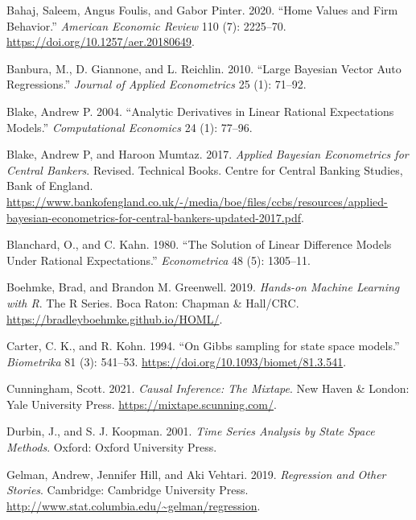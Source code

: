 \documentclass[
  letterpaper,
]{book}
\newlength{\cslhangindent}
\newlength{\cslentryspacingunit} %
\newenvironment{CSLReferences}[2] %
 {%
  \setlength{\parindent}{0pt}
  \ifodd #1
  \let\oldpar\par
  \def\par{\hangindent=\cslhangindent\oldpar}
  \fi
  \setlength{\parskip}{#2\cslentryspacingunit}
 }%
 {}
\begin{document}
\hypertarget{refs}{}
\begin{CSLReferences}{1}{0}
\leavevmode{}%
Bahaj, Saleem, Angus Foulis, and Gabor Pinter. 2020. {``Home Values and
Firm Behavior.''} \emph{American Economic Review} 110 (7): 2225--70.
\url{https://doi.org/10.1257/aer.20180649}.

\leavevmode{}%
Banbura, M., D. Giannone, and L. Reichlin. 2010. {``Large {B}ayesian
Vector Auto Regressions.''} \emph{Journal of Applied Econometrics} 25
(1): 71--92.

\leavevmode{}%
Blake, Andrew P. 2004. {``Analytic Derivatives in Linear Rational
Expectations Models.''} \emph{Computational Economics} 24 (1): 77--96.

\leavevmode{}%
Blake, Andrew P, and Haroon Mumtaz. 2017. \emph{Applied Bayesian
Econometrics for Central Bankers}. Revised. Technical Books. Centre for
Central Banking Studies, Bank of England.
\url{https://www.bankofengland.co.uk/-/media/boe/files/ccbs/resources/applied-bayesian-econometrics-for-central-bankers-updated-2017.pdf}.

\leavevmode{}%
Blanchard, O., and C. Kahn. 1980. {``The Solution of Linear Difference
Models Under Rational Expectations.''} \emph{Econometrica} 48 (5):
1305--11.

\leavevmode{}%
Boehmke, Brad, and Brandon M. Greenwell. 2019. \emph{Hands-on Machine
Learning with {R}}. The {R} Series. Boca Raton: Chapman \& Hall/CRC.
\url{https://bradleyboehmke.github.io/HOML/}.

\leavevmode{}%
Carter, C. K., and R. Kohn. 1994. {``{On {G}ibbs sampling for state
space models}.''} \emph{Biometrika} 81 (3): 541--53.
\url{https://doi.org/10.1093/biomet/81.3.541}.

\leavevmode{}%
Cunningham, Scott. 2021. \emph{Causal Inference: The Mixtape}. New Haven
\& London: Yale University Press. \url{https://mixtape.scunning.com/}.

\leavevmode{}%
Durbin, J., and S. J. Koopman. 2001. \emph{Time Series Analysis by State
Space Methods}. Oxford: Oxford University Press.

\leavevmode{}%
Gelman, Andrew, Jennifer Hill, and Aki Vehtari. 2019. \emph{Regression
and Other Stories}. Cambridge: Cambridge University Press.
\url{http://www.stat.columbia.edu/~gelman/regression}.


\end{CSLReferences}
\end{document}

